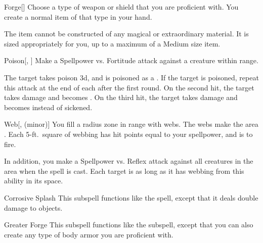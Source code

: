 \begin{ability}[\nth{1}]{Forge}[]
Choose a type of weapon or shield that you are proficient with.
You create a normal item of that type in your hand.

The item cannot be constructed of any magical or extraordinary material.
It is sized appropriately for you, up to a maximum of a Medium size item.
\end{ability}
\vspace{0.25em}


\begin{ability}[\nth{2}]{Poison}[, ]
Make a Spellpower vs. Fortitude attack against a creature within \rngmed range.

\hit The target takes poison  \minus3d, and is poisoned as a .
If the target is poisoned, repeat this attack at the end of each  after the first round.
On the second hit, the target takes damage and becomes .
On the third hit, the target takes damage and becomes  instead of sickened.
\end{ability}
\vspace{0.25em}


\begin{ability}[\nth{2}]{Web}[,  (minor)]
You fill a \areasmall radius zone in \rngclose range with webs.
The webs make the area .
Each 5-ft.\ square of webbing has hit points equal to your spellpower, and is  to fire.

In addition, you make a Spellpower vs. Reflex attack against all creatures in the area when the spell is cast.
\hit Each target is \immobilized as long as it has webbing from this ability in its space.
\end{ability}
\vspace{0.25em}


\begin{ability}[\nth{3}]{Corrosive Splash}
This subspell functions like the  spell, except that it deals double damage to objects.
\end{ability}
\vspace{0.25em}


\begin{ability}[\nth{3}]{Greater Forge}
This subspell functions like the  subspell, except that you can also create any type of body armor you are proficient with.
\end{ability}
\vspace{0.25em}


